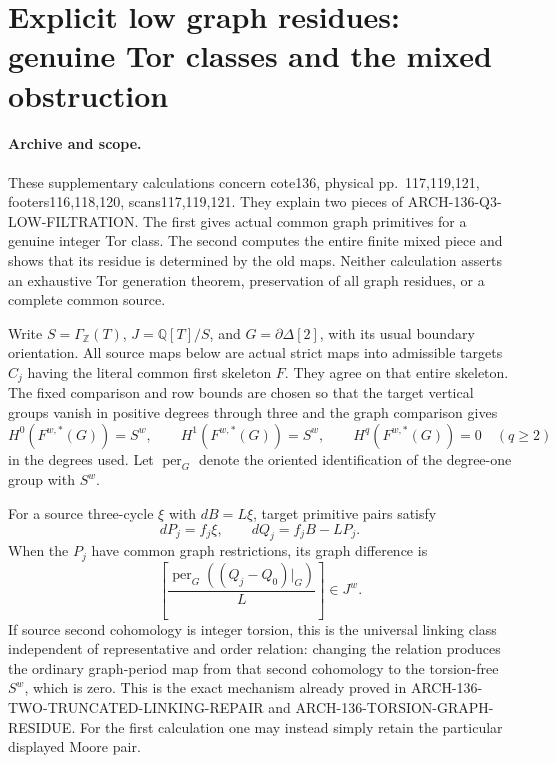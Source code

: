\section{Explicit low graph residues: genuine Tor classes and the mixed obstruction}
\label{sec:136-low-residue-formulas}

\paragraph{Archive and scope.}
These supplementary calculations concern cote136, physical
pp.~117,119,121, footers116,118,120, scans117,119,121.
They explain two pieces of ARCH-136-Q3-LOW-FILTRATION.
The first gives actual common graph primitives for a genuine
integer Tor class. The second computes the entire finite mixed
piece and shows that its residue is determined by the old maps.
Neither calculation asserts an exhaustive Tor generation theorem,
preservation of all graph residues, or a complete common source.

Write \(S=\Gamma_{\mathbb Z}(T)\), \(J=\mathbb Q[T]/S\), and
\(G=\partial\Delta[2]\), with its usual boundary orientation.
All source maps below are actual strict maps into admissible
targets \(C_j\) having the literal common first skeleton \(F\).
They agree on that entire skeleton. The fixed comparison and row
bounds are chosen so that the target vertical groups vanish in
positive degrees through three and the graph comparison gives
\[
 H^0(F^{w,*}(G))=S^w,\qquad H^1(F^{w,*}(G))=S^w,\qquad
 H^q(F^{w,*}(G))=0\quad(q\geq2)
                                                        \tag{136.LGF1}
\]
in the degrees used. Let \(\operatorname{per}_G\) denote the
oriented identification of the degree-one group
with \(S^w\).

For a source three-cycle \(\xi\) with \(dB=L\xi\), target
primitive pairs satisfy
\[
 dP_j=f_j\xi,\qquad dQ_j=f_jB-LP_j.
                                                        \tag{136.LGF2}
\]
When the \(P_j\) have common graph restrictions, its graph
difference is
\[
 \left[\frac{\operatorname{per}_G((Q_j-Q_0)|_G)}{L}\right]
       \in J^w.                                        \tag{136.LGF3}
\]
If source second cohomology is integer torsion, this is the
universal linking class independent of representative and order
relation: changing the relation produces the ordinary graph-period
map from that second cohomology to the torsion-free \(S^w\),
which is zero. This is the exact mechanism already proved in
ARCH-136-TWO-TRUNCATED-LINKING-REPAIR and
ARCH-136-TORSION-GRAPH-RESIDUE. For the first calculation one may
instead simply retain the particular displayed Moore pair.

